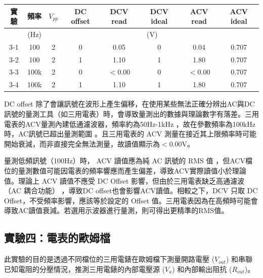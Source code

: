 \documentclass[12pt,a4paper]{article}
\begin{document}
\begin{CJK}{UTF8}{bkai}
\begin{center}
    \begin{tabular}{c|c|c|c|c|c|c|c}
    實驗  &   頻率  &   $V_{pp}$    &   DC offset   &   DCV read    &   DCV ideal   &   ACV read    &   ACV ideal  \\\hline
        &   (Hz)    & \multicolumn{6}{c}{(V)}\\
    \hline
    \hline
    3-1 &   100   &   2  &   0  &   0.05    &   0   &   0.04    &   0.707\\\hline
    3-2 &   100 &   2   &   1   &   1.10    &   1   &   1.80    &   0.707\\\hline
    3-3 &   100k &   2   &   0   &   $<$0.00    &   0   &   $<$0.00    &   0.707\\\hline
    3-4 &   100k &   2   &   1   &   1.10    &   1   &   1.80    &   0.707\\\hline
    \end{tabular}
\end{center}

DC offset 除了會讓訊號在波形上產生偏移，在使用某些無法正確分辨出AC與DC訊號的量測工具（如三用電表）時，會導致量測出的數據與理論數字有落差。三用電表的ACV量測內建低通濾波器，頻率約為50Hz-1kHz ，故在參數頻率為100kHz時，AC訊號已超出量測範圍 。且三用電表的 ACV 測量在接近其上限頻率時可能開始衰減，而非直接完全無法測量，故讀值顯示為$<$0.00V。

量測低頻訊號（100Hz）時， ACV 讀值應為純 AC 訊號的 RMS 值 ，但ACV檔位的量測數值可能因電表的頻率響應而產生偏差，導致ACV實際讀值小於理論值。理論上 ACV 讀值不應受 DC Offset 影響，但由於三用電表缺乏高通濾波（AC 耦合功能） ，導致DC offset也會影響ACV讀值。相較之下，DCV 只取 DC Offset，不受頻率影響，應該等於設定的 Offset 值。三用電表因為在高頻時可能會導致AC讀值衰減。若選用示波器進行量測，則可得出更精準的RMS值。

\subsection{實驗四：電表的歐姆檔}

此實驗的目的是透過不同檔位的三用電錶在歐姆檔下測量開路電壓 ($V_{out}$) 和串聯已知電阻的分壓情況，推測三用電錶的內部電壓源 ($V_{a}$) 和內部輸出阻抗 ($R_{out}$)。


\end{CJK}
\end{document}
